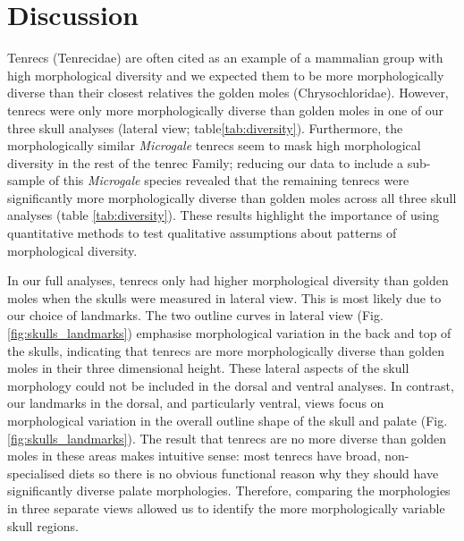 \documentclass[12pt,a4paper]{article}
\begin{document}
\section{Discussion} 

	Tenrecs (Tenrecidae) are often cited as an example of a mammalian group with high morphological diversity \citep{Olson2013, Soarimalala2011, Eisenberg1969} and we expected them to be more morphologically diverse than their closest relatives the golden moles (Chrysochloridae). However, tenrecs were only more morphologically diverse than golden moles in one of our three skull analyses (lateral view; table\ref{tab:diversity}). Furthermore, the morphologically similar \textit{Microgale} tenrecs seem to mask high morphological diversity in the rest of the tenrec Family; reducing our data to include a sub-sample of this \textit{Microgale} species revealed that the remaining tenrecs were significantly more morphologically diverse than golden moles across all three skull analyses (table \ref{tab:diversity}). %
	These results highlight the importance of using quantitative methods to test qualitative assumptions about patterns of morphological diversity.
	
	In our full analyses, tenrecs only had higher morphological diversity than golden moles when the skulls were measured in lateral view. This is most likely due to our choice of landmarks. The two outline curves in lateral view (Fig. \ref{fig:skulls_landmarks}) emphasise morphological variation in the back and top of the skulls, indicating that tenrecs are more morphologically diverse than golden moles in their three dimensional height. %
	These lateral aspects of the skull morphology could not be included in the dorsal and ventral analyses. In contrast, our landmarks in the dorsal, and particularly ventral, views focus on morphological variation in the overall outline shape of the skull and palate (Fig. \ref{fig:skulls_landmarks}). The result that tenrecs are no more diverse than golden moles in these areas makes intuitive sense: most tenrecs have broad, non-specialised diets \citep{Olson2013} so there is no obvious functional reason why they should have significantly diverse palate morphologies.
	Therefore, comparing the morphologies in three separate views allowed us to identify the more morphologically variable skull regions. 
	
\end{document}
